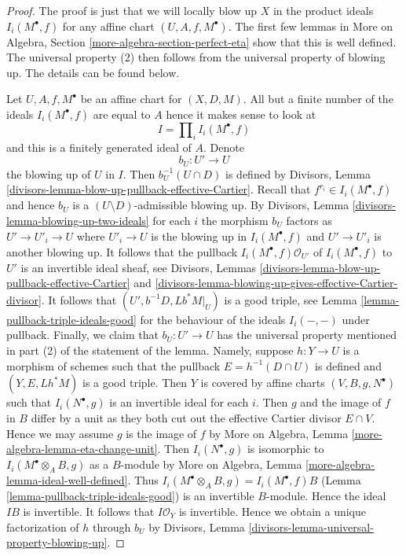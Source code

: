 \documentclass[10pt,a4paper]{amsart}
\theoremstyle{plain}
\theoremstyle{definition}
\theoremstyle{remark}
\numberwithin{equation}{subsection}
\begin{document}
\begin{proof}
The proof is just that we will locally blow up $X$ in the product ideals
$I_i(M^\bullet, f)$ for any affine chart $(U, A, f, M^\bullet)$.
The first few lemmas in More on Algebra, Section
\ref{more-algebra-section-perfect-eta} show that this is well defined.
The universal property (2) then follows from the
universal property of blowing up.
The details can be found below.

\medskip\noindent
Let $U, A, f, M^\bullet$ be an affine chart for $(X, D, M)$.
All but a finite number of the ideals $I_i(M^\bullet, f)$ are
equal to $A$ hence it makes sense to look at
$$
I = \prod\nolimits_i I_i(M^\bullet, f)
$$
and this is a finitely generated ideal of $A$. Denote
$$
b_U : U' \to U
$$
the blowing up of $U$ in $I$. Then $b_U^{-1}(U \cap D)$ is defined by
Divisors, Lemma
\ref{divisors-lemma-blow-up-pullback-effective-Cartier}.
Recall that $f^{r_i} \in I_i(M^\bullet, f)$ and hence
$b_U$ is a $(U \setminus D)$-admissible blowing up.
By Divisors, Lemma \ref{divisors-lemma-blowing-up-two-ideals}
for each $i$ the morphism $b_U$ factors as $U' \to U'_i \to U$
where $U'_i \to U$ is the blowing up in $I_i(M^\bullet, f)$
and $U' \to U'_i$ is another blowing up. It follows that
the pullback $I_i(M^\bullet, f)\mathcal{O}_{U'}$
of $I_i(M^\bullet, f)$ to $U'$ is an invertible ideal sheaf, see
Divisors, Lemmas \ref{divisors-lemma-blow-up-pullback-effective-Cartier} and
\ref{divisors-lemma-blowing-up-gives-effective-Cartier-divisor}.
It follows that $(U', b^{-1}D, Lb^*M|_U)$ is a good triple, see
Lemma \ref{lemma-pullback-triple-ideals-good}
for the behaviour of the ideals $I_i(-,-)$ under pullback.
Finally, we claim that $b_U : U' \to U$ has the universal property
mentioned in part (2) of the statement of the lemma. Namely, suppose
$h : Y \to U$ is a morphism of schemes such that
the pullback $E = h^{-1}(D \cap U)$ is defined and $(Y, E, Lh^*M)$
is a good triple. Then $Y$ is covered by affine charts
$(V, B, g, N^\bullet)$ such that $I_i(N^\bullet, g)$ is
an invertible ideal for each $i$. Then $g$ and the image of
$f$ in $B$ differ by a unit as they both cut out the effective
Cartier divisor $E \cap V$. Hence we may assume $g$ is the image of $f$ by
More on Algebra, Lemma \ref{more-algebra-lemma-eta-change-unit}.
Then $I_i(N^\bullet, g)$ is isomorphic to $I_i(M^\bullet \otimes_A B, g)$
as a $B$-module by More on Algebra, Lemma
\ref{more-algebra-lemma-ideal-well-defined}.
Thus $I_i(M^\bullet \otimes_A B, g) = I_i(M^\bullet, f)B$
(Lemma \ref{lemma-pullback-triple-ideals-good})
is an invertible $B$-module.
Hence the ideal $IB$ is invertible. It follows that $I\mathcal{O}_Y$
is invertible. Hence we obtain a unique factorization of $h$ through
$b_U$ by Divisors, Lemma \ref{divisors-lemma-universal-property-blowing-up}.


\end{proof}
\end{document}
